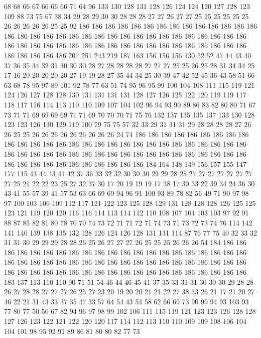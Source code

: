 68 68 66 67 66 66 66 71 64 96 133 130 128 131 128 126 124 124 120 127
128 123 109 88 73 75 67 38 34 29 28 29 30 30 28 28 28 27 27 26
27 27 25 25 25 25 25 25 26 26 26 26 26 25 25 92 186 186 186 186
186 186 186 186 186 186 186 186 186 186 186 186 186 186 186 186 186 186 186 186
186 186 186 186 186 186 186 186 186 186 186 186 186 186 186 186 186 186 186 186
186 186 186 186 186 186 186 186 186 186 186 186 186 207 251 243 219 187 163 156
156 156 130 52 52 47 44 43 40 37 36 35 34 32 31 30 30 30 28 27
28 28 28 28 27 27 27 25 25 26 25 28 31 34 34 25 17 16 20 20
20 20 20 27 19 19 28 27 35 44 34 25 30 39 47 42 52 45 36 43
58 51 66 63 68 78 95 97 89 101 92 78 77 63 51 74 95 96 95 99
100 104 108 111 115 119 121 124 126 127 128 128 130 131 131 131 131 128 127 126
125 122 120 119 119 117 118 117 116 114 113 110 110 109 107 104 102 96 94 93
90 89 86 83 82 80 80 71 67 73 71 71 69 69 69 69 71 71 69 70
70 70 71 75 76 132 137 135 135 137 133 130 128 123 123 126 130 129 119 100
79 75 75 57 32 33 29 31 31 31 29 28 28 28 28 27 26 26 25 25
26 26 26 26 26 26 26 26 26 24 74 186 186 186 186 186 186 186 186 186
186 186 186 186 186 186 186 186 186 186 186 186 186 186 186 186 186 186 186 186
186 186 186 186 186 186 186 186 186 186 186 186 186 186 186 186 186 186 186 186
186 186 186 186 186 186 186 186 186 184 164 148 149 156 157 155 147 177 115 43
44 43 41 42 37 36 33 32 32 30 30 30 29 29 28 28 27 27 27 27
27 27 27 27 25 21 22 22 23 25 27 32 37 30 17 20 19 19 19 17
38 17 30 33 22 39 34 24 36 30 43 41 55 57 39 41 57 53 63 66
69 69 94 96 91 100 93 89 78 82 56 49 71 90 97 98 97 100 103 106
109 112 117 121 122 123 125 128 129 131 128 128 128 126 125 125 123 121 119 120
120 116 116 114 113 114 112 110 108 107 104 103 103 97 92 91 88 87 85 82
81 80 78 70 70 74 73 72 71 71 72 71 74 73 71 73 72 73 74 76
114 142 141 140 139 138 135 132 128 126 124 126 128 131 131 114 87 76 77 75
40 32 33 32 31 31 30 29 29 29 28 28 26 25 26 27 27 27 26 25
25 25 26 26 26 54 184 186 186 186 186 186 186 186 186 186 186 186 186 186
186 186 186 186 186 186 186 186 186 186 186 186 186 186 186 186 186 186 186 186
186 186 186 186 186 186 186 186 186 186 186 186 186 186 186 186 186 186 186 186
186 186 186 186 186 186 183 137 113 110 110 90 71 51 54 46 44 46 45 41
37 35 33 31 31 30 30 30 29 28 28 26 27 28 28 27 27 27 26 25
27 23 20 19 20 20 21 21 22 27 38 33 26 21 17 21 20 27 46 22
21 31 43 33 37 35 47 33 57 64 54 43 54 58 62 66 69 73 90 99
94 93 103 93 77 80 77 50 50 67 82 94 96 97 98 99 102 106 111 115
119 121 123 123 126 128 128 127 126 123 122 121 122 120 120 117 114 112 113 110
110 109 109 108 106 104 104 101 98 95 92 91 89 86 81 80 80 82 77 73

